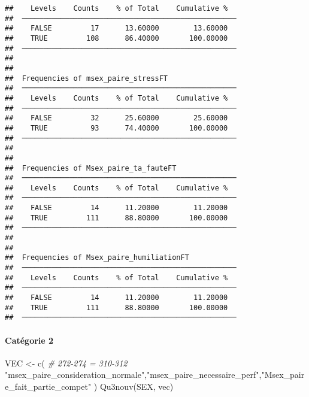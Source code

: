 \documentclass[
]{article}
\newenvironment{Shaded}{\begin{snugshade}}{\end{snugshade}}
\newcommand{\CommentTok}[1]{\textcolor[rgb]{0.56,0.35,0.01}{\textit{#1}}}
\newcommand{\FunctionTok}[1]{\textcolor[rgb]{0.00,0.00,0.00}{#1}}
\newcommand{\NormalTok}[1]{#1}
\newcommand{\OtherTok}[1]{\textcolor[rgb]{0.56,0.35,0.01}{#1}}
\newcommand{\StringTok}[1]{\textcolor[rgb]{0.31,0.60,0.02}{#1}}
\begin{document}
\begin{verbatim}
##    Levels    Counts    % of Total    Cumulative %   
##  ────────────────────────────────────────────────── 
##    FALSE         17      13.60000        13.60000   
##    TRUE         108      86.40000       100.00000   
##  ────────────────────────────────────────────────── 
## 
## 
##  Frequencies of msex_paire_stressFT                 
##  ────────────────────────────────────────────────── 
##    Levels    Counts    % of Total    Cumulative %   
##  ────────────────────────────────────────────────── 
##    FALSE         32      25.60000        25.60000   
##    TRUE          93      74.40000       100.00000   
##  ────────────────────────────────────────────────── 
## 
## 
##  Frequencies of Msex_paire_ta_fauteFT               
##  ────────────────────────────────────────────────── 
##    Levels    Counts    % of Total    Cumulative %   
##  ────────────────────────────────────────────────── 
##    FALSE         14      11.20000        11.20000   
##    TRUE         111      88.80000       100.00000   
##  ────────────────────────────────────────────────── 
## 
## 
##  Frequencies of Msex_paire_humiliationFT            
##  ────────────────────────────────────────────────── 
##    Levels    Counts    % of Total    Cumulative %   
##  ────────────────────────────────────────────────── 
##    FALSE         14      11.20000        11.20000   
##    TRUE         111      88.80000       100.00000   
##  ──────────────────────────────────────────────────
\end{verbatim}

\hypertarget{catuxe9gorie-2-3}{%
\paragraph{Catégorie 2}\label{catuxe9gorie-2-3}}

\begin{Shaded}
\begin{Highlighting}[]
\NormalTok{VEC }\OtherTok{\textless{}{-}} \FunctionTok{c}\NormalTok{(  }\CommentTok{\# 272{-}274 = 310{-}312}
  \StringTok{"msex\_paire\_consideration\_normale"}\NormalTok{,}\StringTok{"msex\_paire\_necessaire\_perf"}\NormalTok{,}\StringTok{"Msex\_paire\_fait\_partie\_compet"}
\NormalTok{)}
\FunctionTok{Qu3nouv}\NormalTok{(SEX, vec)}
\end{Highlighting}
\end{Shaded}
\end{document}
